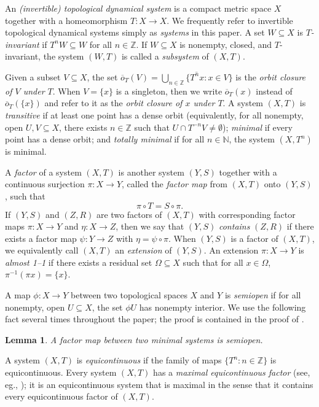 \documentclass{article}
\theoremstyle{plain}
\newtheorem{lemma}[Theorem]{Lemma}
\theoremstyle{claim}
\theoremstyle{definition}
\theoremstyle{plain}
\theoremstyle{plain}
\newcommand{\N}{\mathbb{N}}
\newcommand{\Z}{\mathbb{Z}}
\newcommand{\1}{\boldsymbol{1}}
\newcommand{\orb}{\overline{o}}
\begin{document}
An \emph{(invertible) topological dynamical system} is a compact metric space $X$ together with a homeomorphism $T: X \to X$. We frequently refer to invertible topological dynamical systems simply as \emph{systems} in this paper.  A set $W \subseteq X$ is \emph{$T$-invariant} if $T^n W \subseteq W$ for all $n \in \Z$.  If $W \subseteq X$ is nonempty, closed, and $T$-invariant, the system $(W,T)$ is called a \emph{subsystem} of $(X,T)$.

Given a subset $V\subseteq X$, the set $\orb_T(V)=\overline{\bigcup_{n\in\Z}\{T^nx:x\in V\}}$ is the \emph{orbit closure of $V$ under $T$}. When $V=\{x\}$ is a singleton, then we write $\orb_T(x)$ instead of $\orb_T(\{x\})$ and refer to it as the \emph{orbit closure of $x$ under $T$}. A system $(X,T)$ is \emph{transitive} if at least one point has a dense orbit (equivalently, for all nonempty, open $U, V \subseteq X$, there exists $n \in \Z$ such that $U \cap T^{-n} V \neq \emptyset$); \emph{minimal} if every point has a dense orbit; and \emph{totally minimal} if for all $n \in \N$, the system $(X,T^n)$ is minimal.

A \emph{factor} of a system $(X,T)$ is another system $(Y,S)$ together with a continuous surjection $\pi\colon X\to Y$, called the \emph{factor map} from $(X,T)$ onto $(Y,S)$, such that
\[
\pi\circ T=S\circ \pi.
\]
If $(Y,S)$ and $(Z,R)$ are two factors of $(X,T)$ with corresponding factor maps $\pi\colon X\to Y$ and $\eta\colon X\to Z$, then we say that $(Y,S)$ \emph{contains} $(Z,R)$ if there exists a factor map $\psi \colon Y \to Z$ with $\eta = \psi \circ \pi$.
When $(Y,S)$ is a factor of $(X,T)$, we equivalently call $(X,T)$ an \emph{extension} of $(Y,S)$.  An extension $\pi: X \to Y$ is \emph{almost 1--1} if there exists a residual set $\Omega \subseteq X$ such that for all $x \in \Omega$, $\pi^{-1}( \pi x) = \{x\}$.

A map $\phi : X \to Y$ between two topological spaces $X$ and $Y$ is \emph{semiopen} if for all nonempty, open $U \subseteq X$, the set $\phi U$ has nonempty interior. We use the following fact several times throughout the paper; the proof is contained in the proof of \cite[Lemma 2.9]{glasscock_koutsogiannis_richter_2019}.

\begin{lemma}
\label{lemma_semiopen}
    A factor map between two minimal systems is semiopen.
\end{lemma}

A system $(X,T)$ is \emph{equicontinuous} if the family of maps $\{T^n : n \in \Z\}$ is equicontinuous.  Every system $(X,T)$ has a \emph{maximal equicontinuous factor} (see, eg., \cite[Ch. 9]{Auslander88}); it is an equicontinuous system that is maximal in the sense that it contains every equicontinuous factor of $(X,T)$.
\end{document}
